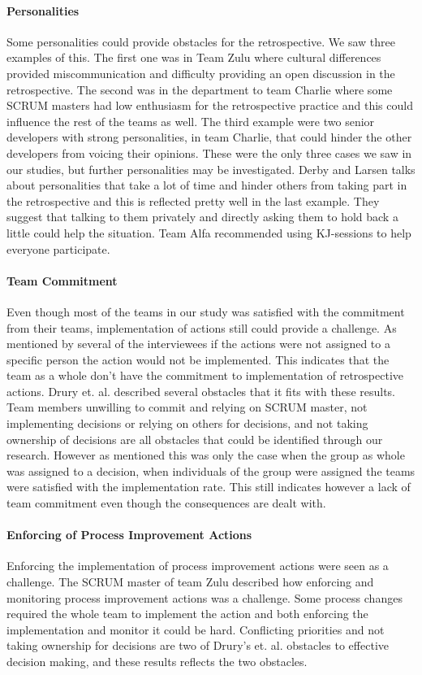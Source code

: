 \paragraph{Personalities}
Some personalities could provide obstacles for the retrospective. We saw three examples of this. The first one was in Team Zulu where cultural differences provided miscommunication and difficulty providing an open discussion in the retrospective. The second was in the department to team Charlie where some SCRUM masters had low enthusiasm for the retrospective practice and this could influence the rest of the teams as well. The third example were two senior developers with strong personalities, in team Charlie, that could hinder the other developers from voicing their opinions. These were the only three cases we saw in our studies, but further personalities may be investigated. Derby and Larsen \cite{Larsen2006} talks about personalities that take a lot of time and hinder others from taking part in the retrospective and this is reflected pretty well in the last example. They suggest that talking to them privately and directly asking them to hold back a little could help the situation. Team Alfa recommended using KJ-sessions to help everyone participate.

\paragraph{Team Commitment}
Even though most of the teams in our study was satisfied with the commitment from their teams, implementation of actions still could provide a challenge. As mentioned by several of the interviewees if the actions were not assigned to a specific person the action would not be implemented. This indicates that the team as a whole don't have the commitment to implementation of retrospective actions. Drury et. al. \cite{Drury2012} described several obstacles that it fits with these results. Team members unwilling to commit and relying on SCRUM master, not implementing decisions or relying on others for decisions, and not taking ownership of decisions are all obstacles that could be identified through our research. However as mentioned this was only the case when the group as whole was assigned to a decision, when individuals of the group were assigned the teams were satisfied with the implementation rate. This still indicates however a lack of team commitment even though the consequences are dealt with. 

\paragraph{Enforcing of Process Improvement Actions}
Enforcing the implementation of process improvement actions were seen as a challenge. The SCRUM master of team Zulu described how enforcing and monitoring process improvement actions was a challenge. Some process changes required the whole team to implement the action and both enforcing the implementation and monitor it could be hard. Conflicting priorities and not taking ownership for decisions are two of Drury's et. al. \cite{Drury2012} obstacles to effective decision making, and these results reflects the two obstacles. 

